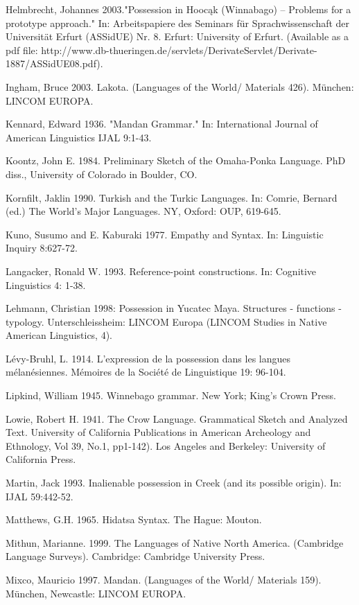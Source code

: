 \documentclass[output=paper]{LSP/langsci}
\begin{document}
\begin{reflist}
Helmbrecht, Johannes 2003."Possession in Hooc\k{a}k (Winnabago) – Problems for a prototype approach." In: Arbeitspapiere des Seminars für Sprachwissenschaft der Universität Erfurt (ASSidUE) Nr. 8. Erfurt: University of Erfurt. (Available as a pdf file: http://www.db-thueringen.de/servlets/DerivateServlet/Derivate-1887/ASSidUE08.pdf).

Ingham, Bruce 2003. Lakota. (Languages of the World/ Materials 426). München: LINCOM EUROPA.

Kennard, Edward 1936. "Mandan Grammar." In: International Journal of American Linguistics IJAL 9:1-43.

Koontz, John E. 1984. Preliminary Sketch of the Omaha-Ponka Language. PhD diss., University of Colorado in Boulder, CO.

Kornfilt, Jaklin 1990. Turkish and the Turkic Languages. In: Comrie, Bernard (ed.) The World's Major Languages. NY, Oxford: OUP, 619-645.

Kuno, Susumo and E. Kaburaki 1977. Empathy and Syntax. In: Linguistic Inquiry 8:627-72.

Langacker, Ronald W. 1993. Reference-point constructions. In: Cognitive Linguistics 4: 1-38.

Lehmann, Christian 1998: Possession in Yucatec Maya. Structures - functions - typology. Unterschleissheim: LINCOM Europa (LINCOM Studies in Native American Linguistics, 4).

Lévy-Bruhl, L. 1914. L’expression de la possession dans les langues mélanésiennes. Mémoires de la Société de Linguistique 19: 96-104.

Lipkind, William 1945. Winnebago grammar. New York; King’s Crown Press.

Lowie, Robert H. 1941. The Crow Language. Grammatical Sketch and Analyzed Text. University of California Publications in American Archeology and Ethnology, Vol 39, No.1, pp1-142). Los Angeles and Berkeley: University of California Press.

Martin, Jack 1993. Inalienable possession in Creek (and its possible origin). In: IJAL 59:442-52.

Matthews, G.H. 1965. Hidatsa Syntax. The Hague: Mouton.

Mithun, Marianne. 1999. The Languages of Native North America. (Cambridge Language Surveys). Cambridge: Cambridge University Press.

Mixco, Mauricio 1997. Mandan. (Languages of the World/ Materials 159). München, Newcastle: LINCOM EUROPA.


\end{reflist}
\end{document}
